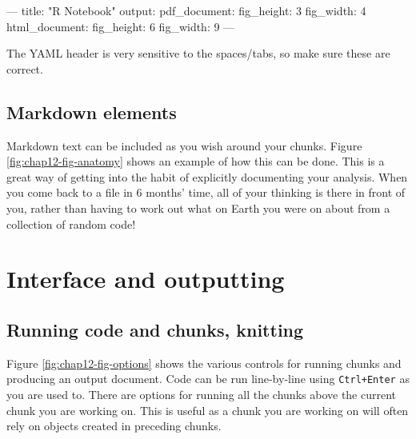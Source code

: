 \documentclass[
  12pt,
  krantz2]{krantz}
\makeatletter
\newenvironment{Shaded}{\begin{snugshade}}{\end{snugshade}}
\newcommand{\BaseNTok}[1]{\textcolor[rgb]{0.00,0.00,0.81}{#1}}
\newcommand{\NormalTok}[1]{#1}
\newenvironment{kframe}{%
\medskip{}
\setlength{\fboxsep}{.8em}
 \def\at@end@of@kframe{}%
 \ifinner\ifhmode%
  \def\at@end@of@kframe{\end{minipage}}%
  \begin{minipage}{\columnwidth}%
 \fi\fi%
 \def\FrameCommand##1{\hskip\@totalleftmargin \hskip-\fboxsep
 \colorbox{shadecolor}{##1}\hskip-\fboxsep
     \hskip-\linewidth \hskip-\@totalleftmargin \hskip\columnwidth}%
 \MakeFramed {\advance\hsize-\width
   \@totalleftmargin\z@ \linewidth\hsize
   \@setminipage}}%
 {\par\unskip\endMakeFramed%
 \at@end@of@kframe}
\renewenvironment{Shaded}{\begin{kframe}}{\end{kframe}}
\makeatother
\begin{document}
\begin{Shaded}
\begin{Highlighting}[]
\NormalTok{---}
\NormalTok{title: "R Notebook"}
\NormalTok{output: }
\NormalTok{  pdf_document: }
\BaseNTok{    fig_height: 3}
\BaseNTok{    fig_width: 4}
\NormalTok{  html_document: }
\BaseNTok{    fig_height: 6}
\BaseNTok{    fig_width: 9}
\NormalTok{---}
\end{Highlighting}
\end{Shaded}

The YAML header is very sensitive to the spaces/tabs, so make sure these are correct.

\hypertarget{markdown-elements}{%
\subsection{Markdown elements}\label{markdown-elements}}

Markdown text can be included as you wish around your chunks.
Figure \ref{fig:chap12-fig-anatomy} shows an example of how this can be done.
This is a great way of getting into the habit of explicitly documenting your analysis.
When you come back to a file in 6 months' time, all of your thinking is there in front of you, rather than having to work out what on Earth you were on about from a collection of random code!

\hypertarget{interface-and-outputting}{%
\section{Interface and outputting}\label{interface-and-outputting}}

\hypertarget{running-code-and-chunks-knitting}{%
\subsection{Running code and chunks, knitting}\label{running-code-and-chunks-knitting}}


Figure \ref{fig:chap12-fig-options} shows the various controls for running chunks and producing an output document.
Code can be run line-by-line using \texttt{Ctrl+Enter} as you are used to.
There are options for running all the chunks above the current chunk you are working on.
This is useful as a chunk you are working on will often rely on objects created in preceding chunks.
\end{document}
